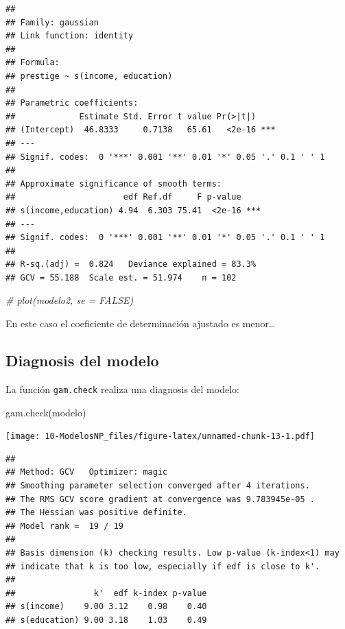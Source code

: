 \documentclass[
]{book}
\newenvironment{Shaded}{\begin{snugshade}}{\end{snugshade}}
\newcommand{\CommentTok}[1]{\textcolor[rgb]{0.56,0.35,0.01}{\textit{#1}}}
\newcommand{\FunctionTok}[1]{\textcolor[rgb]{0.00,0.00,0.00}{#1}}
\newcommand{\NormalTok}[1]{#1}
\theoremstyle{break}
\begin{document}
\begin{verbatim}
## 
## Family: gaussian 
## Link function: identity 
## 
## Formula:
## prestige ~ s(income, education)
## 
## Parametric coefficients:
##             Estimate Std. Error t value Pr(>|t|)    
## (Intercept)  46.8333     0.7138   65.61   <2e-16 ***
## ---
## Signif. codes:  0 '***' 0.001 '**' 0.01 '*' 0.05 '.' 0.1 ' ' 1
## 
## Approximate significance of smooth terms:
##                      edf Ref.df     F p-value    
## s(income,education) 4.94  6.303 75.41  <2e-16 ***
## ---
## Signif. codes:  0 '***' 0.001 '**' 0.01 '*' 0.05 '.' 0.1 ' ' 1
## 
## R-sq.(adj) =  0.824   Deviance explained = 83.3%
## GCV = 55.188  Scale est. = 51.974    n = 102
\end{verbatim}

\begin{Shaded}
\begin{Highlighting}[]
\CommentTok{\# plot(modelo2, se = FALSE)}
\end{Highlighting}
\end{Shaded}

En este caso el coeficiente de determinación ajustado es menor\ldots{}

\hypertarget{diagnosis-del-modelo-2}{%
\subsection{Diagnosis del modelo}\label{diagnosis-del-modelo-2}}

La función \texttt{gam.check} realiza una diagnosis del modelo:

\begin{Shaded}
\begin{Highlighting}[]
\FunctionTok{gam.check}\NormalTok{(modelo)}
\end{Highlighting}
\end{Shaded}

\texttt{[image: 10-ModelosNP\_files/figure-latex/unnamed-chunk-13-1.pdf]}

\begin{verbatim}
## 
## Method: GCV   Optimizer: magic
## Smoothing parameter selection converged after 4 iterations.
## The RMS GCV score gradient at convergence was 9.783945e-05 .
## The Hessian was positive definite.
## Model rank =  19 / 19 
## 
## Basis dimension (k) checking results. Low p-value (k-index<1) may
## indicate that k is too low, especially if edf is close to k'.
## 
##                k'  edf k-index p-value
## s(income)    9.00 3.12    0.98    0.40
## s(education) 9.00 3.18    1.03    0.49
\end{verbatim}
\end{document}
